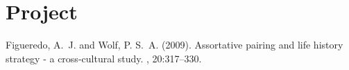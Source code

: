 \chapter{Project}







\begin{thebibliography}{99} %

Figueredo, A.~J. and Wolf, P. S.~A. (2009).
\newblock Assortative pairing and life history strategy - a cross-cultural
  study.
, 20:317--330.
 
\end{thebibliography}



